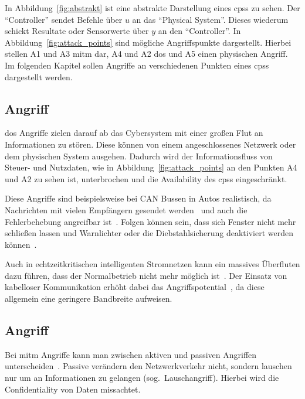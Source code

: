 \documentclass[final,bibliography=totocnumbered]{include/sikseminar}
\newcommand{\cps}{\glspl{cps}\xspace}
\begin{document}
In Abbildung~\ref{fig:abstrakt} ist eine abstrakte Darstellung eines \cps zu sehen.
Der \enquote{Controller} sendet Befehle über $u$ an das \enquote{Physical System}.
Dieses wiederum schickt Resultate oder Sensorwerte über $y$ an den \enquote{Controller}.
In Abbildung~\ref{fig:attack_points} sind mögliche Angriffspunkte dargestellt.
Hierbei stellen A1 und A3 \gls{mitm} dar, A4 und A2 \gls{dos} und A5 einen physischen Angriff.
Im folgenden Kapitel sollen Angriffe an verschiedenen Punkten eines \cps dargestellt werden.


\subsection{ Angriff}\label{subsec:dos}
\gls{dos} Angriffe zielen darauf ab das Cybersystem mit einer großen Flut an Informationen zu stören.
Diese können von einem angeschlossenes Netzwerk oder dem physischen System ausgehen.
Dadurch wird der Informationsfluss von Steuer- und Nutzdaten, wie in Abbildung~\ref{fig:attack_points} an den Punkten A4 und A2 zu sehen ist, unterbrochen und die Availability des \cps eingeschränkt.

Diese Angriffe sind beispielsweise bei CAN Bussen in Autos realistisch, da Nachrichten mit vielen Empfängern gesendet werden~\cite{KCR+10} und auch die Fehlerbehebung angreifbar ist~\cite{CDV13}.
Folgen können sein, dass sich Fenster nicht mehr schließen lassen und Warnlichter oder die Diebstahlsicherung deaktiviert werden können~\cite{HKD08}.

Auch in echtzeitkritischen intelligenten Stromnetzen kann ein massives Überfluten dazu führen, dass der Normalbetrieb nicht mehr möglich ist~\cite{LLW+10}.
Der Einsatz von kabelloser Kommunikation erhöht dabei das Angriffspotential~\cite{LWW11}, da diese allgemein eine geringere Bandbreite aufweisen.


\subsection{ Angriff}\label{subsec:mitm}
Bei \gls{mitm} Angriffe kann man zwischen aktiven und passiven Angriffen unterscheiden~\cite{WYX+10}.
Passive verändern den Netzwerkverkehr nicht, sondern lauschen nur um an Informationen zu gelangen (sog.\ Lauschangriff).
Hierbei wird die Confidentiality von Daten missachtet.
\end{document}
